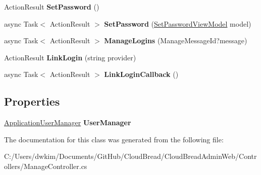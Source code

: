 \begin{DoxyCompactItemize}
\item 
Action\+Result {\bfseries Set\+Password} ()\hypertarget{class_cloud_bread_admin_web_1_1_controllers_1_1_manage_controller_a90fad78b6c0ffb66f1e00accb28825fe}{}\label{class_cloud_bread_admin_web_1_1_controllers_1_1_manage_controller_a90fad78b6c0ffb66f1e00accb28825fe}

\item 
async Task$<$ Action\+Result $>$ {\bfseries Set\+Password} (\hyperlink{class_cloud_bread_admin_web_1_1_models_1_1_set_password_view_model}{Set\+Password\+View\+Model} model)\hypertarget{class_cloud_bread_admin_web_1_1_controllers_1_1_manage_controller_adb6c5449627ef88d6b3ec43840ebe4df}{}\label{class_cloud_bread_admin_web_1_1_controllers_1_1_manage_controller_adb6c5449627ef88d6b3ec43840ebe4df}

\item 
async Task$<$ Action\+Result $>$ {\bfseries Manage\+Logins} (Manage\+Message\+Id?message)\hypertarget{class_cloud_bread_admin_web_1_1_controllers_1_1_manage_controller_a25bed768c69c7fb329d8a7b3e58a1f08}{}\label{class_cloud_bread_admin_web_1_1_controllers_1_1_manage_controller_a25bed768c69c7fb329d8a7b3e58a1f08}

\item 
Action\+Result {\bfseries Link\+Login} (string provider)\hypertarget{class_cloud_bread_admin_web_1_1_controllers_1_1_manage_controller_a6d6242b23d9aeaa50288d389d31e8493}{}\label{class_cloud_bread_admin_web_1_1_controllers_1_1_manage_controller_a6d6242b23d9aeaa50288d389d31e8493}

\item 
async Task$<$ Action\+Result $>$ {\bfseries Link\+Login\+Callback} ()\hypertarget{class_cloud_bread_admin_web_1_1_controllers_1_1_manage_controller_a99fceb22c48a89bd03e86afa42189b25}{}\label{class_cloud_bread_admin_web_1_1_controllers_1_1_manage_controller_a99fceb22c48a89bd03e86afa42189b25}

\end{DoxyCompactItemize}
\subsection*{Properties}
\begin{DoxyCompactItemize}
\item 
\hyperlink{class_cloud_bread_admin_web_1_1_application_user_manager}{Application\+User\+Manager} {\bfseries User\+Manager}\hypertarget{class_cloud_bread_admin_web_1_1_controllers_1_1_manage_controller_a5cdb4aff4fe4c96ee42a67ae0695dc16}{}\label{class_cloud_bread_admin_web_1_1_controllers_1_1_manage_controller_a5cdb4aff4fe4c96ee42a67ae0695dc16}

\end{DoxyCompactItemize}


The documentation for this class was generated from the following file\+:\begin{DoxyCompactItemize}
\item 
C\+:/\+Users/dwkim/\+Documents/\+Git\+Hub/\+Cloud\+Bread/\+Cloud\+Bread\+Admin\+Web/\+Controllers/Manage\+Controller.\+cs\end{DoxyCompactItemize}
